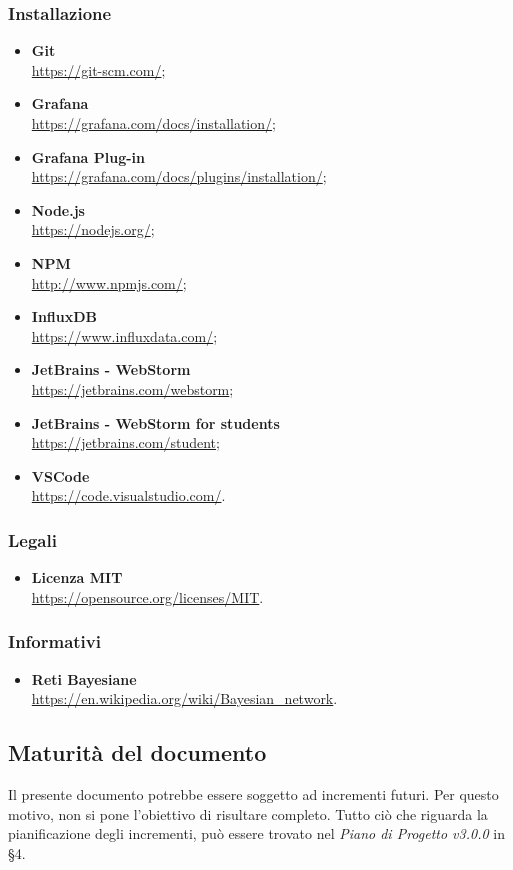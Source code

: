 \subsubsection{Installazione}
\begin{itemize}
	\item{\textbf{Git}\\
		\url{https://git-scm.com/}};
	\item{\textbf{Grafana}\\
		\url{https://grafana.com/docs/installation/}};
	\item{\textbf{Grafana Plug-in}\\
		\url{https://grafana.com/docs/plugins/installation/}};
	\item{\textbf{Node.js}\\
		\url{https://nodejs.org/}};
	\item{\textbf{NPM}\\
		\url{http://www.npmjs.com/}};
	\item{\textbf{InfluxDB}\\
		\url{https://www.influxdata.com/}};
	\item{\textbf{JetBrains - WebStorm}\\
		\url{https://jetbrains.com/webstorm}};
	\item{\textbf{JetBrains - WebStorm for students}\\
		\url{https://jetbrains.com/student}};
	\item{\textbf{VSCode}\\
		\url{https://code.visualstudio.com/}}.
\end{itemize}
\subsubsection{Legali}
\begin{itemize}
	\item{\textbf{Licenza MIT}\\
		\url{https://opensource.org/licenses/MIT}}.
\end{itemize}
\subsubsection{Informativi}
\begin{itemize}
	\item{\textbf{Reti Bayesiane}\\
			\url{https://en.wikipedia.org/wiki/Bayesian_network}}.
\end{itemize}

\subsection{Maturità del documento}
Il presente documento potrebbe essere soggetto ad incrementi futuri. Per questo motivo, non si pone l'obiettivo di risultare completo.
Tutto ciò che riguarda la pianificazione degli incrementi, può essere trovato nel \emph{Piano di Progetto v3.0.0} in §4.
\pagebreak